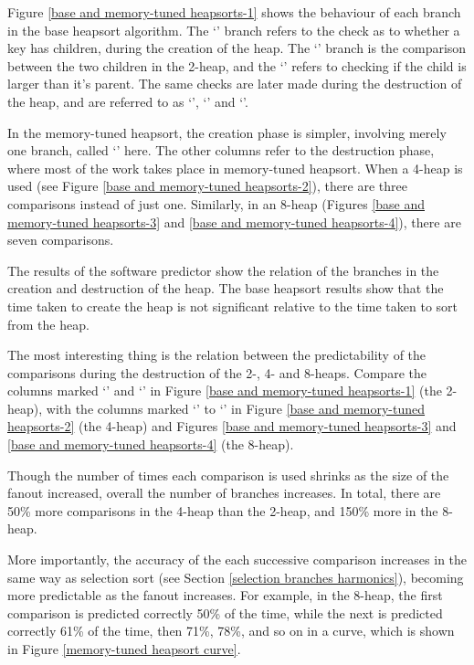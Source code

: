 Figure \ref{base and memory-tuned heapsorts-1} shows the behaviour of each
branch in the base heapsort algorithm. The `' branch
refers to the check as to whether a key has children, during the creation of the
heap. The `' branch is the comparison between the
two children in the 2-heap, and the `' refers to
checking if the child is larger than it's parent. The same checks are later made
during the destruction of the heap, and are referred to as `', `' and `'.

In the memory-tuned heapsort, the creation phase is simpler, involving merely
one branch, called `' here. The other columns refer to the destruction
phase, where most of the work takes place in memory-tuned heapsort.  When a
4-heap is used (see Figure \ref{base and memory-tuned heapsorts-2}), there are
three comparisons instead of just one. Similarly, in an 8-heap (Figures
\ref{base and memory-tuned heapsorts-3} and \ref{base and memory-tuned
heapsorts-4}), there are seven comparisons.

The results of the software predictor show the relation of the branches
in the creation and destruction of the heap. The base heapsort results show that
the time taken to create the heap is not significant relative to the time taken
to sort from the heap.

The most interesting thing is the relation between the predictability of the
comparisons during the destruction of the 2-, 4- and 8-heaps. Compare the
columns marked `' and `' in Figure \ref{base and memory-tuned heapsorts-1} (the 2-heap), with
the columns marked `' to `' in Figure
\ref{base and memory-tuned heapsorts-2} (the 4-heap) and Figures \ref{base and
memory-tuned heapsorts-3} and \ref{base and memory-tuned heapsorts-4} (the
8-heap).

Though the number of times each comparison is used shrinks as the size of the
fanout increased, overall the number of branches increases.  In total, there are
50\% more comparisons in the 4-heap than the 2-heap, and 150\% more in the
8-heap.

More importantly, the accuracy of the each successive comparison increases in
the same way as selection sort (see Section \ref{selection branches harmonics}),
becoming more predictable as the fanout increases. For example, in the 8-heap,
the first comparison is predicted correctly 50\% of the time, while the next is
predicted correctly 61\% of the time, then 71\%, 78\%, and so on in a curve,
which is shown in Figure \ref{memory-tuned heapsort curve}.

